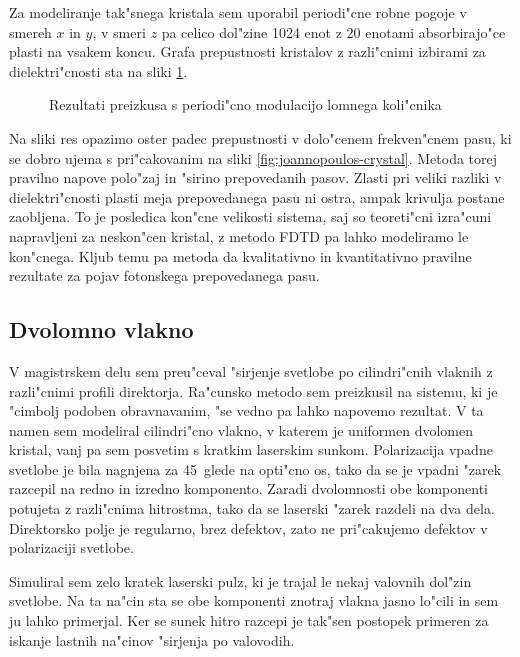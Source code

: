 \documentclass[a4paper,10pt]{article}
\begin{document}
Za modeliranje tak"snega kristala sem uporabil periodi"cne robne pogoje v smereh $x$ in $y$, v smeri $z$ pa celico dol"zine 1024 enot z 20 enotami absorbirajo"ce plasti na vsakem koncu. 
Grafa prepustnosti kristalov z razli"cnimi izbirami za dielektri"cnosti sta na sliki \ref{fig:test-periodic}. 

\begin{figure}[!h]
 
 \caption{Rezultati preizkusa s periodi"cno modulacijo lomnega koli"cnika}
 \label{fig:test-periodic}
\end{figure}

Na sliki res opazimo oster padec prepustnosti v dolo"cenem frekven"cnem pasu, ki se dobro ujema s pri"cakovanim na sliki \ref{fig:joannopoulos-crystal}. 
Metoda torej pravilno napove polo"zaj in "sirino prepovedanih pasov. 
Zlasti pri veliki razliki v dielektri"cnosti plasti meja prepovedanega pasu ni ostra, ampak krivulja postane zaobljena. 
To je posledica kon"cne velikosti sistema, saj so teoreti"cni izra"cuni napravljeni za neskon"cen kristal, z metodo \acs{FDTD} pa lahko modeliramo le kon"cnega. 
Kljub temu pa metoda da kvalitativno in kvantitativno pravilne rezultate za pojav fotonskega prepovedanega pasu. 

\subsection{Dvolomno vlakno}
V magistrskem delu sem preu"ceval "sirjenje svetlobe po cilindri"cnih vlaknih z razli"cnimi profili direktorja. 
Ra"cunsko metodo sem preizkusil na sistemu, ki je "cimbolj podoben obravnavanim, "se vedno pa lahko napovemo rezultat. 
V ta namen sem modeliral cilindri"cno vlakno, v katerem je uniformen dvolomen kristal, vanj pa sem posvetim s kratkim laserskim sunkom. 
Polarizacija vpadne svetlobe je bila nagnjena za 45\degree~glede na opti"cno os, tako da se je vpadni "zarek razcepil na redno in izredno komponento. 
Zaradi dvolomnosti obe komponenti potujeta z razli"cnima hitrostma, tako da se laserski "zarek razdeli na dva dela. 
Direktorsko polje je regularno, brez defektov, zato ne pri"cakujemo defektov v polarizaciji svetlobe. 

Simuliral sem zelo kratek laserski pulz, ki je trajal le nekaj valovnih dol"zin svetlobe. 
Na ta na"cin sta se obe komponenti znotraj vlakna jasno lo"cili in sem ju lahko primerjal. 
Ker se sunek hitro razcepi je tak"sen postopek primeren za iskanje lastnih na"cinov "sirjenja po valovodih\cite{taflove}. 
\end{document}
